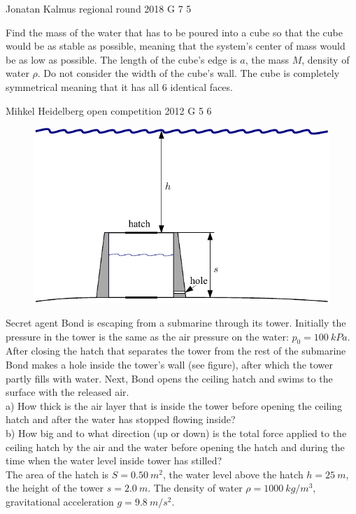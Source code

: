 \documentclass[11pt]{article}
\begin{document}
{Jonatan Kalmus} %
{regional round} %
{2018} %
{G 7} %
{5} %
{

\ifEngStatement
Find the mass of the water that has to be poured into a cube so that the cube would be as stable as possible, meaning that the system’s center of mass would be as low as possible. The length of the cube’s edge is $a$, the mass $M$, density of water $\rho$. Do not consider the width of the cube’s wall. The cube is completely symmetrical meaning that it has all 6 identical faces.
\fi
}

{Mihkel Heidelberg} %
{open competition} %
{2012} %
{G 5} %
{6} %
{

\ifEngStatement
\begin{figure}%
\includegraphics[width=\linewidth]{2012-lahg-05-allveelaev_g_ing}%
\end{figure}
Secret agent Bond is escaping from a submarine through its tower. Initially the pressure in the tower is the same as the air pressure on the water: $p_0 = \SI{100}{kPa}$. After closing the hatch that separates the tower from the rest of the submarine Bond makes a hole inside the tower’s wall (see figure), after which the tower partly fills with water. Next, Bond opens the ceiling hatch and swims to the surface with the released air.\\
a) How thick is the air layer that is inside the tower before opening the ceiling hatch and after the water has stopped flowing inside?\\
b) How big and to what direction (up or down) is the total force applied to the ceiling hatch by the air and the water before opening the hatch and during the time when the water level inside tower has stilled?\\
The area of the hatch is $S =
\SI{0,50}{m^2}$, the water level above the hatch $h=\SI{25}{m}$, the height of the tower $s=\SI{2,0}{m}$. The density of water $\rho = \SI{1000}{kg/m^3}$, gravitational acceleration $g =
\SI{9,8}{m/s^2}$.
\fi
}
\end{document}
